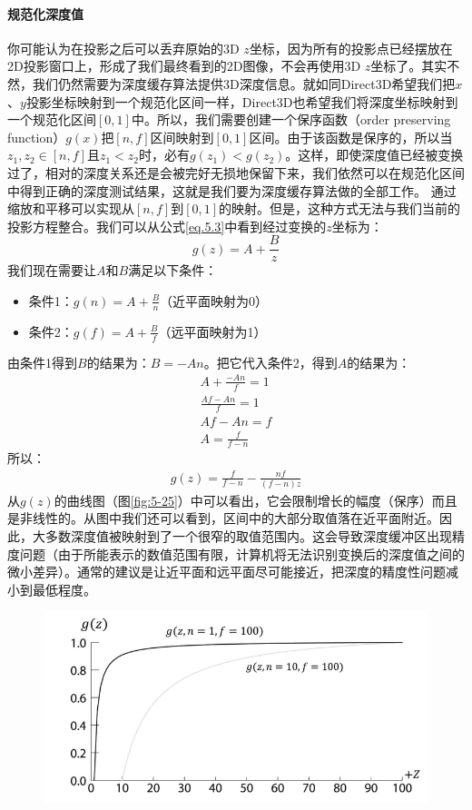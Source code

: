 \documentclass[11pt,a4paper,oldfontcommands]{memoir}
\begin{document}
{\paragraph{规范化深度值}
\begin{flushleft}
你可能认为在投影之后可以丢弃原始的3D $z$坐标，因为所有的投影点已经摆放在2D投影窗口上，形成了我们最终看到的2D图像，不会再使用3D $z$坐标了。其实不然，我们仍然需要为深度缓存算法提供3D深度信息。就如同Direct3D希望我们把$x$、$y$投影坐标映射到一个规范化区间一样，Direct3D也希望我们将深度坐标映射到一个规范化区间$[0,1]$中。所以，我们需要创建一个保序函数（order preserving function）$g(x)$把$[n,f]$区间映射到$[0,1]$区间。由于该函数是保序的，所以当$z_{1},z_{2}∈[n,f]$且$z_{1}<z_{2}$时，必有$g(z_{1})<g(z_{2})$。这样，即使深度值已经被变换过了，相对的深度关系还是会被完好无损地保留下来，我们依然可以在规范化区间中得到正确的深度测试结果，这就是我们要为深度缓存算法做的全部工作。
通过缩放和平移可以实现从$[n ,f]$到$[0,1]$的映射。但是，这种方式无法与我们当前的投影方程整合。我们可以从公式\ref{eq.5.3}中看到经过变换的$z$坐标为：
$$g(z)=A+\frac{B}{z}$$
我们现在需要让$A$和$B$满足以下条件：
\begin{itemize}
	\item 条件1：$g(n)=A+\frac{B}{n}$（近平面映射为0）
	\item 条件2：$g(f)=A+\frac{B}{f}$（远平面映射为1）
\end{itemize}
由条件1得到$B$的结果为：$B=-An$。把它代入条件2，得到$A$的结果为：
\begin{align*}
A+\frac{-An}{f}=1\\
\frac{Af-An}{f}=1\\
Af-An=f\\
A=\frac{f}{f-n}
\end{align*}
所以：
\begin{align*}
g(z)=\frac{f}{f-n}-\frac{nf}{(f-n)z}
\end{align*}
从$g(z)$的曲线图（图\ref{fig:5-25}）中可以看出，它会限制增长的幅度（保序）而且是非线性的。从图中我们还可以看到，区间中的大部分取值落在近平面附近。因此，大多数深度值被映射到了一个很窄的取值范围内。这会导致深度缓冲区出现精度问题（由于所能表示的数值范围有限，计算机将无法识别变换后的深度值之间的微小差异）。通常的建议是让近平面和远平面尽可能接近，把深度的精度性问题减小到最低程度。
\end{flushleft}
\begin{figure}[b]
    \includegraphics[width=\textwidth]{5-25}

\end{figure}}
\end{document}
